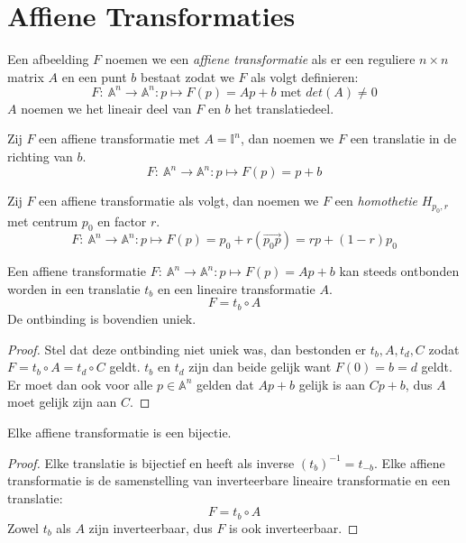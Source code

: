 \documentclass[main.tex]{subfiles}
\begin{document}
\chapter{Affiene Transformaties}
\label{cha:affiene-transformaties}

\begin{de}
  Een afbeelding $F$ noemen we een \emph{affiene transformatie} als er een reguliere $n\times n$ matrix $A$ en een punt $b$ bestaat zodat we $F$ als volgt definieren:
  \[ F:\ \mathbb{A}^{n} \rightarrow \mathbb{A}^{n}: p \mapsto F(p) = Ap + b \text{ met } det(A) \neq 0 \]
  $A$ noemen we het lineair deel van $F$ en $b$ het translatiedeel.
\end{de}

\begin{de}
  Zij $F$ een affiene transformatie met $A=\mathbb{I}^{n}$, dan noemen we $F$ een translatie in de richting van $b$.
  \[ F:\ \mathbb{A}^{n} \rightarrow \mathbb{A}^{n}: p \mapsto F(p) = p + b \]
\end{de}

\begin{de}
  Zij $F$ een affiene transformatie als volgt, dan noemen we $F$ een \emph{homothetie} $H_{p_{0},r}$ met centrum $p_{0}$ en factor $r$.
  \[ F:\ \mathbb{A}^{n} \rightarrow \mathbb{A}^{n}: p \mapsto F(p) = p_{0} + r(\overrightarrow{p_{0}p}) = rp + (1-r)p_{0} \]
\end{de}

\begin{st}
  Een affiene transformatie $F:\ \mathbb{A}^{n} \rightarrow \mathbb{A}^{n}: p \mapsto F(p) = Ap + b$ kan steeds ontbonden worden in een translatie $t_{b}$ en een lineaire transformatie $A$.
  \[ F = t_{b} \circ A \]
  De ontbinding is bovendien uniek.

  \begin{proof}
    Stel dat deze ontbinding niet uniek was, dan bestonden er $t_{b},A,t_{d},C$ zodat $F = t_{b}\circ A = t_{d} \circ C$ geldt.
    $t_{b}$ en $t_{d}$ zijn dan beide gelijk want $F(0) = b = d$ geldt.
    Er moet dan ook voor alle $p\in \mathbb{A}^{n}$ gelden dat $Ap+b$ gelijk is aan $Cp+b$, dus $A$ moet gelijk zijn aan $C$.
  \end{proof}
\end{st}

\begin{st}
  Elke affiene transformatie is een bijectie.

  \begin{proof}
    Elke translatie is bijectief en heeft als inverse $(t_{b})^{-1} = t_{-b}$.
    Elke affiene transformatie is de samenstelling van inverteerbare lineaire transformatie en een translatie:
    \[ F = t_{b} \circ A \]
    Zowel $t_{b}$ als $A$ zijn inverteerbaar, dus $F$ is ook inverteerbaar.
  \end{proof}
\end{st}
\end{document}
